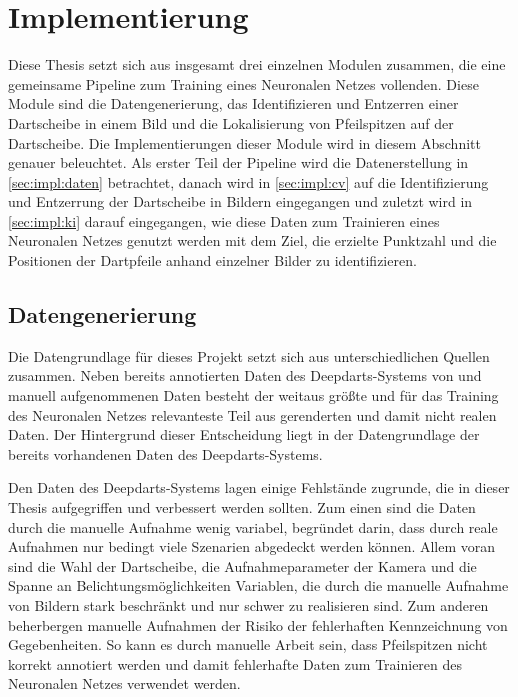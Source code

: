 
\chapter{Implementierung}

Diese Thesis setzt sich aus insgesamt drei einzelnen Modulen zusammen, die eine gemeinsame Pipeline zum Training eines Neuronalen Netzes vollenden. Diese Module sind die Datengenerierung, das Identifizieren und Entzerren einer Dartscheibe in einem Bild und die Lokalisierung von Pfeilspitzen auf der Dartscheibe. Die Implementierungen dieser Module wird in diesem Abschnitt genauer beleuchtet. Als erster Teil der Pipeline wird die Datenerstellung in \autoref{sec:impl:daten} betrachtet, danach wird in \autoref{sec:impl:cv} auf die Identifizierung und Entzerrung der Dartscheibe in Bildern eingegangen und zuletzt wird in \autoref{sec:impl:ki} darauf eingegangen, wie diese Daten zum Trainieren eines Neuronalen Netzes genutzt werden mit dem Ziel, die erzielte Punktzahl und die Positionen der Dartpfeile anhand einzelner Bilder zu identifizieren.

\section{Datengenerierung}
\label{sec:impl:daten}

Die Datengrundlage für dieses Projekt setzt sich aus unterschiedlichen Quellen zusammen. Neben bereits annotierten Daten des Deepdarts-Systems von \citeauthor{deepdarts} \cite{deepdarts-data} und manuell aufgenommenen Daten besteht der weitaus größte und für das Training des Neuronalen Netzes relevanteste Teil aus gerenderten und damit nicht realen Daten. Der Hintergrund dieser Entscheidung liegt in der Datengrundlage der bereits vorhandenen Daten des Deepdarts-Systems.

Den Daten des Deepdarts-Systems lagen einige Fehlstände zugrunde, die in dieser Thesis aufgegriffen und verbessert werden sollten. Zum einen sind die Daten durch die manuelle Aufnahme wenig variabel, begründet darin, dass durch reale Aufnahmen nur bedingt viele Szenarien abgedeckt werden können. Allem voran sind die Wahl der Dartscheibe, die Aufnahmeparameter der Kamera und die Spanne an Belichtungsmöglichkeiten Variablen, die durch die manuelle Aufnahme von Bildern stark beschränkt und nur schwer zu realisieren sind. Zum anderen beherbergen manuelle Aufnahmen der Risiko der fehlerhaften Kennzeichnung von Gegebenheiten. So kann es durch manuelle Arbeit sein, dass Pfeilspitzen nicht korrekt annotiert werden und damit fehlerhafte Daten zum Trainieren des Neuronalen Netzes verwendet werden.

